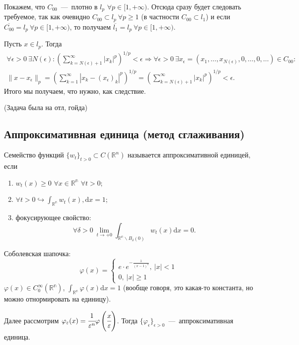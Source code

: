 \begin{solution}
    Покажем, что $C_{00}$~---~плотно в $l_p$ $\forall p \in [1, +\infty)$. Отсюда сразу будет следовать требуемое, так как очевидно $C_{00} \subset l_p \ \forall p \geq 1$ (в частности $C_{00} \subset l_1$) и если $\overline{C_{00}} = l_p \ \forall p \in [1, +\infty)$, то получаем $\overline{l_1} = l_p \ \forall p \in [1, +\infty)$.

    Пусть $x \in l_p$. Тогда
    \begin{multline*}
        \forall \epsilon > 0 \ \exists N(\epsilon): \left( \sum_{k = N(\epsilon) +1}^{\infty} |x_k|^p\right)^{1/p} < \epsilon \Longrightarrow  \forall \epsilon > 0 \  \exists x_{\epsilon}= (x_1, \ldots, x_{N(\epsilon)}, 0, \ldots, 0, \ldots) \in C_{00}: \\ \|x - x_{\epsilon}\|_p = \left( \sum_{k = 1}^{\infty} |x_k - (x_{\epsilon})_k|^p\right)^{1/p} = \left( \sum_{k = N(\epsilon) +1}^{\infty} |x_k|^p\right)^{1/p} < \epsilon.
    \end{multline*}
    Итого мы получаем, что нужно, как следствие.
\end{solution}

\begin{problem}
    (Задача была на отл, гойда)
\end{problem}

\newpage
\subsection{Аппроксимативная единица (метод сглаживания)}

\begin{definition}
    Семейство функций $\{ w_t\}_{t > 0} \subset C(\mathbb{R}^n)$ называется аппроксимативной единицей, если
    \begin{enumerate}
        \item $w_t (x) \geq 0$ $\forall x \in \mathbb{R^n}$ $\forall t > 0$;
        \item $\displaystyle \forall t > 0 \hookrightarrow \int_{\mathbb{R^n}} w_t(x), \text{d} x = 1$;
        \item фокусирующее свойство:
        $$\forall \delta > 0 \ \lim_{t \to + 0} \int_{\mathbb{R^n} \backslash B_{\delta} (0)} w_t (x) \text{d} x = 0.$$
    \end{enumerate}
\end{definition}


\begin{example}
    Соболевская шапочка:
    $$\varphi(x) = \begin{cases}
        e\cdot e^{-\frac{1}{(x-1)^2}}, \ |x| < 1 \\
        0, \ |x| \geq 1
    \end{cases}$$
    $\varphi(x) \in C_{0}^{\infty} (\mathbb{R^n})$, $\displaystyle \int_{\mathbb{R^n}} \varphi(x) \text{d} x = 1$ (вообще говоря, это какая-то константа, но можно отнормировать на единицу).

    Далее рассмотрим $\varphi_{\epsilon} (x) = \cfrac{1}{\epsilon^n} \varphi\left( \cfrac{x}{\epsilon}\right)$. Тогда $\{ \varphi_{\epsilon} \}_{\epsilon > 0}$~---~аппроксимативная единица.

\end{example}